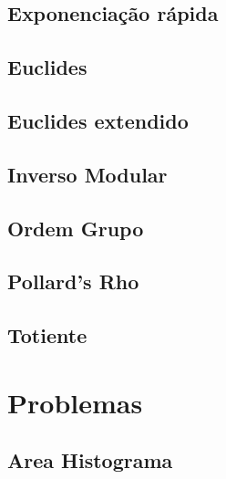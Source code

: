 \documentclass[12pt, a4paper, twoside]{article}
\begin{document}
\subsection{Exponenciação rápida}


\subsection{Euclides}


\subsection{Euclides extendido}


\subsection{Inverso Modular}


\subsection{Ordem Grupo}


\subsection{Pollard's Rho}


\subsection{Totiente}




%
%

\section{Problemas}

\subsection{Area Histograma}

\end{document}
